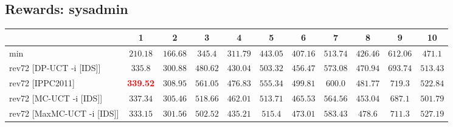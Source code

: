 \documentclass{article}
\begin{document}
\bigskip

\subsection*{Rewards: sysadmin}

\begin{tabular}{|l|r@{$\pm$}rr@{$\pm$}rr@{$\pm$}rr@{$\pm$}rr@{$\pm$}rr@{$\pm$}rr@{$\pm$}rr@{$\pm$}rr@{$\pm$}rr@{$\pm$}r|}
\hline

& \multicolumn{2}{c}{1}
& \multicolumn{2}{c}{2}
& \multicolumn{2}{c}{3}
& \multicolumn{2}{c}{4}
& \multicolumn{2}{c}{5}
& \multicolumn{2}{c}{6}
& \multicolumn{2}{c}{7}
& \multicolumn{2}{c}{8}
& \multicolumn{2}{c}{9}
& \multicolumn{2}{c|}{10}
\\
\hline
\hline
min
& \multicolumn{2}{c}{$210.18$}
& \multicolumn{2}{c}{$166.68$}
& \multicolumn{2}{c}{$345.4$}
& \multicolumn{2}{c}{$311.79$}
& \multicolumn{2}{c}{$443.05$}
& \multicolumn{2}{c}{$407.16$}
& \multicolumn{2}{c}{$513.74$}
& \multicolumn{2}{c}{$426.46$}
& \multicolumn{2}{c}{$612.06$}
& \multicolumn{2}{c|}{$471.1$}
\\
rev72 [DP-UCT -i [IDS]]
& \multicolumn{2}{c}{$335.8$}
& \multicolumn{2}{c}{$300.88$}
& \multicolumn{2}{c}{$480.62$}
& \multicolumn{2}{c}{$430.04$}
& \multicolumn{2}{c}{$503.32$}
& \multicolumn{2}{c}{$456.47$}
& \multicolumn{2}{c}{$573.08$}
& \multicolumn{2}{c}{$470.94$}
& \multicolumn{2}{c}{$693.74$}
& \multicolumn{2}{c|}{$513.43$}
\\
rev72 [IPPC2011]
& \multicolumn{2}{c}{\textbf{\textcolor{red}{339.52}}}
& \multicolumn{2}{c}{$308.95$}
& \multicolumn{2}{c}{$561.05$}
& \multicolumn{2}{c}{$476.83$}
& \multicolumn{2}{c}{$555.34$}
& \multicolumn{2}{c}{$499.81$}
& \multicolumn{2}{c}{$600.0$}
& \multicolumn{2}{c}{$481.77$}
& \multicolumn{2}{c}{$719.3$}
& \multicolumn{2}{c|}{$522.84$}
\\
rev72 [MC-UCT -i [IDS]]
& \multicolumn{2}{c}{$337.34$}
& \multicolumn{2}{c}{$305.46$}
& \multicolumn{2}{c}{$518.66$}
& \multicolumn{2}{c}{$462.01$}
& \multicolumn{2}{c}{$513.71$}
& \multicolumn{2}{c}{$465.53$}
& \multicolumn{2}{c}{$564.56$}
& \multicolumn{2}{c}{$453.04$}
& \multicolumn{2}{c}{$687.1$}
& \multicolumn{2}{c|}{$501.79$}
\\
rev72 [MaxMC-UCT -i [IDS]]
& \multicolumn{2}{c}{$333.15$}
& \multicolumn{2}{c}{$301.56$}
& \multicolumn{2}{c}{$502.52$}
& \multicolumn{2}{c}{$435.21$}
& \multicolumn{2}{c}{$515.4$}
& \multicolumn{2}{c}{$473.01$}
& \multicolumn{2}{c}{$583.43$}
& \multicolumn{2}{c}{$478.6$}
& \multicolumn{2}{c}{$711.3$}
& \multicolumn{2}{c|}{$527.19$}

\end{tabular}
\end{document}
